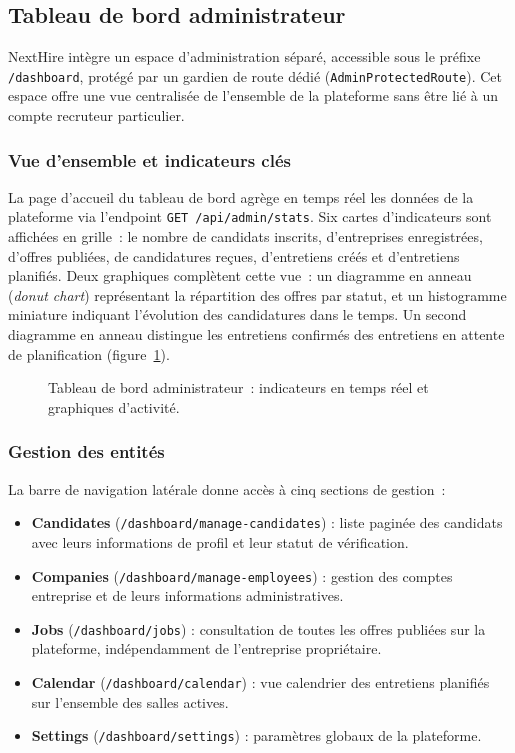 \subsection{Tableau de bord administrateur}

NextHire intègre un espace d'administration séparé, accessible sous le préfixe
\texttt{/dashboard}, protégé par un gardien de route dédié (\texttt{AdminProtectedRoute}).
Cet espace offre une vue centralisée de l'ensemble de la plateforme sans être lié à un
compte recruteur particulier.

\subsubsection{Vue d'ensemble et indicateurs clés}

La page d'accueil du tableau de bord agrège en temps réel les données de la plateforme via
l'endpoint \texttt{GET /api/admin/stats}. Six cartes d'indicateurs sont affichées en grille~:
le nombre de candidats inscrits, d'entreprises enregistrées, d'offres publiées, de
candidatures reçues, d'entretiens créés et d'entretiens planifiés. Deux graphiques complètent
cette vue~: un diagramme en anneau (\textit{donut chart}) représentant la répartition des
offres par statut, et un histogramme miniature indiquant l'évolution des candidatures dans
le temps. Un second diagramme en anneau distingue les entretiens confirmés des entretiens
en attente de planification (figure~\ref{fig:admin-dashboard}).

\begin{figure}[H]
  \centering
  \caption{Tableau de bord administrateur~: indicateurs en temps réel et graphiques d'activité.}
  \label{fig:admin-dashboard}
\end{figure}

\subsubsection{Gestion des entités}

La barre de navigation latérale donne accès à cinq sections de gestion~:

\begin{itemize}
  \item \textbf{Candidates} (\texttt{/dashboard/manage-candidates}) : liste paginée des
        candidats avec leurs informations de profil et leur statut de vérification.
  \item \textbf{Companies} (\texttt{/dashboard/manage-employees}) : gestion des comptes
        entreprise et de leurs informations administratives.
  \item \textbf{Jobs} (\texttt{/dashboard/jobs}) : consultation de toutes les offres publiées
        sur la plateforme, indépendamment de l'entreprise propriétaire.
  \item \textbf{Calendar} (\texttt{/dashboard/calendar}) : vue calendrier des entretiens
        planifiés sur l'ensemble des salles actives.
  \item \textbf{Settings} (\texttt{/dashboard/settings}) : paramètres globaux de la
        plateforme.
\end{itemize}

